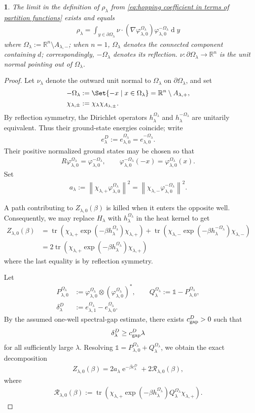 \documentclass[a4paper,10pt]{article}
\numberwithin{equation}{section}
\theoremstyle{plain}
\theoremstyle{plain}
\newtheorem{lem}[thm]{\protect\lemmaname}
\theoremstyle{plain}
\theoremstyle{plain}
\theoremstyle{plain}
\theoremstyle{remark}
\theoremstyle{definition}
\providecommand{\lemmaname}{Lemma}
\newcommand{\ee}{\operatorname{e}}
\newcommand{\RR}{\mathbb{R}}
\newcommand{\calR}{\mathcal{R}}
\newcommand\norm[1]{\left\lVert#1\right\rVert}
\newcommand{\dif}{\operatorname{d}\!} %
\newcommand{\tr}{\operatorname{tr}}
\newcommand{\vf}{\varphi}
\newcommand{\Id}{\mathds{1}}
\newcommand{\eq}[1]{\begin{align*}#1\end{align*}}
\newcommand{\eql}[1]{\begin{align}#1\end{align}}
\newcommand{\br}[1]{\left(#1\right)}
\begin{document}
\begin{lem}
    The limit in the definition of $\rho_\lambda$ from \cref{eq:hopping coefficient in terms of partition functions} exists and equals
    \eql{\label{eq:flux equation for hopping coeffivient}
\rho_\lambda
=
\int_{y\in\partial\Omega_\lambda}
\nu\cdot\br{\nabla\vf_{\lambda,0}^{\Omega_\lambda}}
\vf_{\lambda,0}^{-\Omega_\lambda}
\dif{y}
} where $\Omega_\lambda := \RR^n\setminus A_{\lambda,-}$; when
$n=1$, $\Omega_\lambda$ denotes the connected component containing
$d$; correspondingly, $-\Omega_\lambda$ denotes its reflection.  $\nu:\partial \Omega_\lambda \to \RR^n$ is the unit normal pointing out of $\Omega_\lambda$.
\end{lem}
\begin{proof}
Let $\nu_\lambda$ denote the outward unit normal to
$\Omega_\lambda$ on $\partial\Omega_\lambda$, and set
\eq{
-\Omega_\lambda
&:=
\Set{-x\mid x\in\Omega_\lambda}
=
\RR^n\setminus A_{\lambda,+},\\
\chi_{\lambda,\pm}
&:=
\chi_\lambda\chi_{A_{\lambda,\pm}}.
}
By reflection symmetry, the Dirichlet operators
$h_\lambda^{\Omega_\lambda}$ and $h_\lambda^{-\Omega_\lambda}$ are
unitarily equivalent. Thus their ground-state energies coincide; write
\eq{
e_\lambda^D
:=
e_{\lambda,0}^{\Omega_\lambda}
=
e_{\lambda,0}^{-\Omega_\lambda}.
}
Their positive normalized ground states may be chosen so that
\eq{
R\vf_{\lambda,0}^{\Omega_\lambda}
=
\vf_{\lambda,0}^{-\Omega_\lambda},
\qquad
\vf_{\lambda,0}^{-\Omega_\lambda}(-x)
=
\vf_{\lambda,0}^{\Omega_\lambda}(x).
}
Set
\eq{
a_\lambda
:=
\norm{
\chi_{\lambda,+}
\vf_{\lambda,0}^{\Omega_\lambda}
}^2
=
\norm{
\chi_{\lambda,-}
\vf_{\lambda,0}^{-\Omega_\lambda}
}^2.
}

A path contributing to $Z_{\lambda,0}(\beta)$ is killed when it enters
the opposite well. Consequently, we may replace $H_\lambda$ with $h_\lambda^{\Omega_\lambda}$ in the heat kernel to get
\eq{
Z_{\lambda,0}(\beta)
&=
\tr\br{
\chi_{\lambda,+}
\exp\br{-\beta h_\lambda^{\Omega_\lambda}}
\chi_{\lambda,+}
}+
\tr\br{
\chi_{\lambda,-}
\exp\br{-\beta h_\lambda^{-\Omega_\lambda}}
\chi_{\lambda,-}
} \\ 
&= 2\tr\br{
\chi_{\lambda,+}
\exp\br{-\beta h_\lambda^{\Omega_\lambda}}
\chi_{\lambda,+}
}
} where the last equality is by reflection symmetry.


Let
\eq{
P_{\lambda,0}^{\Omega_\lambda}
&:=
\vf_{\lambda,0}^{\Omega_\lambda}
\otimes
\br{\vf_{\lambda,0}^{\Omega_\lambda}}^*,
\qquad
Q_{\lambda}^{\Omega_\lambda}
:=
\Id-P_{\lambda,0}^{\Omega_\lambda},\\
\delta_\lambda^D
&:=
e_{\lambda,1}^{\Omega_\lambda}
-
e_{\lambda,0}^{\Omega_\lambda}.
}
By the assumed one-well spectral-gap estimate, there exists
$c_{\rm gap}^D>0$ such that
\eq{
\delta_\lambda^D
\geq
c_{\rm gap}^D\lambda
}
for all sufficiently large $\lambda$.
Resolving 
$\Id=P_{\lambda,0}^{\Omega_\lambda}
+Q_{\lambda}^{\Omega_\lambda}$, we obtain the exact decomposition
\eql{\label{eq:zero passage spectral decomposition}
Z_{\lambda,0}(\beta)
=
2a_\lambda\ee^{-\beta e_\lambda^D}
+
2\calR_{\lambda,0}(\beta),
}
where
\eq{
\calR_{\lambda,0}(\beta)
:=
\tr\br{
\chi_{\lambda,+}
\exp\br{-\beta h_\lambda^{\Omega_\lambda}}
Q_{\lambda}^{\Omega_\lambda}
\chi_{\lambda,+}
}.
}


\end{proof}
\end{document}
